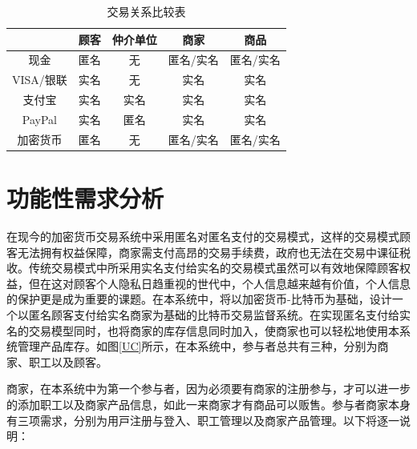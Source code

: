 		\begin{table}[!htbp]
		\centering
		\caption{交易关系比较表}
		\label{txvs}
		\begin{tabular}{|c|c|c|c|c|}
		\hline
		 & 顾客 & 仲介单位 & 商家 & 商品 \\ \hline
		现金 & 匿名 & 无 & 匿名/实名 & 匿名/实名 \\ \hline
		VISA/银联 & 实名 & 无 & 实名 & 实名 \\ \hline
		支付宝 & 实名 & 实名 & 实名 & 实名 \\ \hline
		PayPal & 实名 & 匿名 & 实名 & 实名 \\ \hline
		加密货币 & 匿名 & 无 & 匿名/实名 & 匿名/实名 \\ \hline
		\end{tabular}
		\end{table}

\section{功能性需求分析}

在现今的加密货币交易系统中采用匿名对匿名⽀付的交易模式，这样的交易模式顾客无法拥有权益保障，商家需支付高昂的交易手续费，政府也无法在交易中课征税收。传统交易模式中所采用实名⽀付给实名的交易模式虽然可以有效地保障顾客权益，但在这对顾客个⼈隐私⽇趋重视的世代中，个⼈信息越来越有价值，个⼈信息的保护更是成为重要的课题。在本系统中，将以加密货币-⽐特币为基础，设计⼀个以匿名顾客⽀付给实名商家为基础的比特币交易监督系统。在实现匿名⽀付给实名的交易模型同时，也将商家的库存信息同时加⼊，使商家也可以轻松地使用本系统管理产品库存。如图\ref{UC}所示，在本系统中，参与者总共有三种，分别为商家、职⼯以及顾客。

商家，在本系统中为第⼀个参与者，因为必须要有商家的注册参与，才可以进⼀步的添加职⼯以及商家产品信息，如此⼀来商家才有商品可以贩售。参与者商家本⾝有三项需求，分别为⽤⼾注册与登⼊、职⼯管理以及商家产品管理。以下将逐⼀说明：


